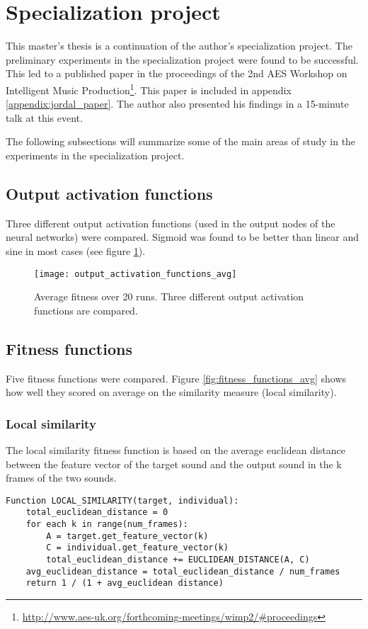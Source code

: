 \section{Specialization project}
This master's thesis is a continuation of the author's specialization project. The preliminary experiments in the specialization project were found to be successful. This led to a published paper in the proceedings of the 2nd AES Workshop on Intelligent Music Production\footnote{\url{http://www.aes-uk.org/forthcoming-meetings/wimp2/\#proceedings}}. This paper is included in appendix \ref{appendix:jordal_paper}. The author also presented his findings in a 15-minute talk at this event.

The following subsections will summarize some of the main areas of study in the experiments in the specialization project.

\subsection{Output activation functions}
Three different output activation functions (used in the output nodes of the neural networks) were compared. Sigmoid was found to be better than linear and sine in most cases (see figure \ref{fig:output_activation_functions_avg}).

\begin{figure}[H]
    \centering
    \texttt{[image: output\_activation\_functions\_avg]}
    \caption{Average fitness over 20 runs. Three different output activation functions are compared.}
    \label{fig:output_activation_functions_avg}
\end{figure}

\subsection{Fitness functions}
Five fitness functions were compared. Figure \ref{fig:fitness_functions_avg} shows how well they scored on average on the similarity measure (local similarity).

\subsubsection{Local similarity}
The local similarity fitness function is based on the average euclidean distance between the feature vector of the target sound and the output sound in the k frames of the two sounds.

\begin{verbatim}
Function LOCAL_SIMILARITY(target, individual):
    total_euclidean_distance = 0
    for each k in range(num_frames):
        A = target.get_feature_vector(k)
        C = individual.get_feature_vector(k)
        total_euclidean_distance += EUCLIDEAN_DISTANCE(A, C)
    avg_euclidean_distance = total_euclidean_distance / num_frames
    return 1 / (1 + avg_euclidean distance)
\end{verbatim}

